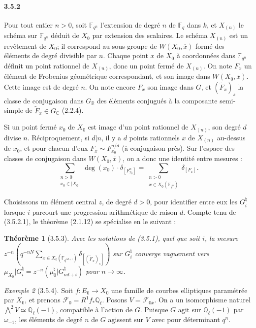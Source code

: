 \documentclass[12pt,a4paper]{article}
\theoremstyle{plain}
\newtheorem{theorem}{Th\'eor\`eme}[section]
\theoremstyle{definition}
\theoremstyle{remark}
\newtheorem{example}[theorem]{Exemple}
\newcommand{\CC}{{\mathbb{C}}}
\newcommand{\FF}{{\mathbb{F}}}
\newcommand{\QQ}{{\mathbb{Q}}}
\newcommand{\RR}{{\mathbb{R}}}
\begin{document}
\paragraph{3.5.2}
Pour tout entier $n > 0$, soit $\FF_{q^n}$ l'extension de degr\'e $n$ de $\FF_q$ dans $k$, et $X_{(n)}$ le sch\'ema sur $\FF_{q^n}$ d\'eduit de $X_0$ par extension des scalaires. Le sch\'ema $X_{(n)}$ est un rev\^etement de $X_0$; il correspond au sous-groupe de $W(X_0, \overline{x})$ form\'e des \'el\'ements de degr\'e divisible par $n$. Chaque point $x$ de $X_0$ \`a coordonn\'ees dans $\FF_{q^n}$ d\'efinit un point rationnel de $X_{(n)}$, donc un point ferm\'e de $X_{(n)}$. On note $F_x$ un \'el\'ement de Frobenius g\'eom\'etrique correspondant, et son image dans $W(X_0, \overline{x})$. Cette image est de degr\'e $n$. On note encore $F_x$ son image dans $G$, et $(\tilde{F}_x)_s$ la classe de conjugaison dans $G_\RR$ des \'el\'ements conjugu\'es \`a la composante semi-simple de $\tilde{F}_x \in G_\CC$ (2.2.4).

Si un point ferm\'e $x_0$ de $X_0$ est image d'un point rationnel de $X_{(n)}$, son degr\'e $d$ divise $n$. R\'eciproquement, si $d|n$, il y a $d$ points rationnels $x$ de $X_{(n)}$ au-dessus de $x_0$, et pour chacun d'eux $F_x \sim F_{x_0}^{n/d}$ (\`a conjugaison pr\`es). Sur l'espace des classes de conjugaison dans $W(X_0, \overline{x})$, on a donc une identit\'e entre mesures :
\begin{equation}\label{eq:3.5.2.1}
\sum_{\substack{n > 0 \\ x_0 \in |X_0|}} \deg(x_0) \cdot \delta_{[F_{x_0}^n]} = \sum_{\substack{n > 0 \\ x \in X_0(\FF_{q^n})}} \delta_{[F_x]}.
\end{equation}

Choisissons un \'el\'ement central $z$, de degr\'e $d > 0$, pour identifier entre eux les $G_i^\natural$ lorsque $i$ parcourt une progression arithm\'etique de raison $d$. Compte tenu de (3.5.2.1), le th\'eor\`eme (2.1.12) se sp\'ecialise en le suivant :


\begin{theorem}[3.5.3]
Avec les notations de (3.5.1), quel que soit $i$, la mesure $z^{-n}(q^{-nN} \sum_{x \in X_0(\FF_{q^{nd+i}})} \delta_{[(\tilde{F}_x)_s]})$ sur $G_i^\natural$ converge vaguement vers $\mu_{X_0}|G_i^\natural = z^{-n}(\mu_0^\natural|G_{nd+i}^\natural)$ pour $n \to \infty$.
\end{theorem}

\begin{example}[3.5.4]
Soit $f : E_0 \to X_0$ une famille de courbes elliptiques param\'etr\'ee par $X_0$, et prenons $\mathscr{F}_0 = R^1 f_* \QQ_\ell$. Posons $V = \mathscr{F}_{0\overline{x}}$. On a un isomorphisme naturel $\bigwedge^2 V \simeq \QQ_\ell(-1)$, compatible \`a l'action de $G$. Puisque $G$ agit sur $\QQ_\ell(-1)$ par $\omega_{-1}$, les \'el\'ements de degr\'e $n$ de $G$ agissent sur $V$ avec pour d\'eterminant $q^n$.
\end{example}
\end{document}
